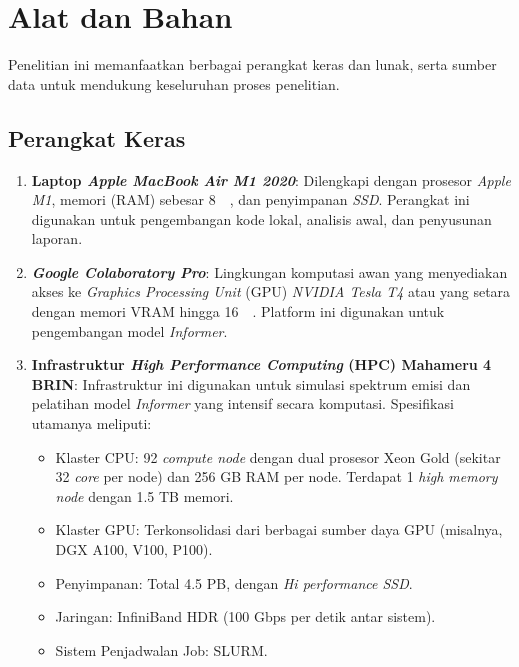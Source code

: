 \section{Alat dan Bahan}
Penelitian ini memanfaatkan berbagai perangkat keras dan lunak, serta sumber data untuk mendukung keseluruhan proses penelitian.

\subsection{Perangkat Keras}
\begin{enumerate}
  \item \textbf{Laptop \textit{Apple MacBook Air M1 2020}}: Dilengkapi dengan prosesor \textit{Apple M1}, memori (RAM) sebesar \SI{8}{\giga\byte}, dan penyimpanan \textit{SSD}. Perangkat ini digunakan untuk pengembangan kode lokal, analisis awal, dan penyusunan laporan.
  \item \textbf{\textit{Google Colaboratory Pro}}: Lingkungan komputasi awan yang menyediakan akses ke \textit{Graphics Processing Unit} (GPU) \textit{NVIDIA Tesla T4} atau yang setara dengan memori VRAM hingga \SI{16}{\giga\byte}. Platform ini digunakan untuk pengembangan model \textit{Informer}.
  \item \textbf{Infrastruktur \textit{High Performance Computing} (HPC) Mahameru 4 BRIN}: Infrastruktur ini digunakan untuk simulasi spektrum emisi dan pelatihan model \textit{Informer} yang intensif secara komputasi. Spesifikasi utamanya meliputi:
  \begin{itemize}
    \item Klaster CPU: 92 \textit{compute node} dengan dual prosesor Xeon Gold (sekitar 32 \textit{core} per node) dan 256 GB RAM per node. Terdapat 1 \textit{high memory node} dengan 1.5 TB memori.
    \item Klaster GPU: Terkonsolidasi dari berbagai sumber daya GPU (misalnya, DGX A100, V100, P100).
    \item Penyimpanan: Total 4.5 PB, dengan \textit{Hi performance SSD}.
    \item Jaringan: InfiniBand HDR (100 Gbps per detik antar sistem).
    \item Sistem Penjadwalan Job: SLURM.
  \end{itemize}
\end{enumerate}


